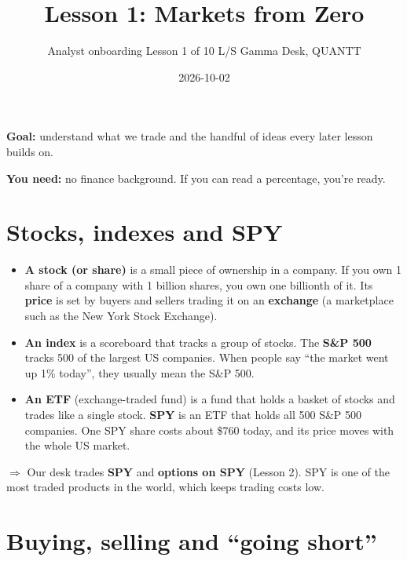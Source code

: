 \documentclass{article}
\title{Lesson 1: Markets from Zero}
\author{Analyst onboarding \textperiodcentered{} Lesson 1 of 10 \textperiodcentered{} L/S Gamma Desk, QUANTT}
\date{2026-10-02}
\begin{document}
\maketitle

\textbf{Goal:} understand what we trade and the handful of ideas every later lesson builds on.

\textbf{You need:} no finance background. If you can read a percentage, you're ready.

\section{Stocks, indexes and SPY}

\begin{itemize}

\item \textbf{A stock (or share)} is a small piece of ownership in a company. If you own 1 share of a company with 1 billion shares, you own one billionth of it. Its \textbf{price} is set by buyers and sellers trading it on an \textbf{exchange} (a marketplace such as the New York Stock Exchange).

\item \textbf{An index} is a scoreboard that tracks a group of stocks. The \textbf{S\&P 500} tracks 500 of the largest US companies. When people say ``the market went up 1\% today'', they usually mean the S\&P 500.

\item \textbf{An ETF} (exchange-traded fund) is a fund that holds a basket of stocks and trades like a single stock. \textbf{SPY} is an ETF that holds all 500 S\&P 500 companies. One SPY share costs about \$760 today, and its price moves with the whole US market.

\end{itemize}

\textbf{$\Rightarrow$} Our desk trades \textbf{SPY} and \textbf{options on SPY} (Lesson 2). SPY is one of the most traded products in the world, which keeps trading costs low.

\section{Buying, selling and ``going short''}
\end{document}
